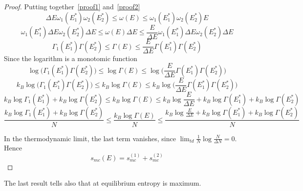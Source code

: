 \begin{proof}
        Putting together~\eqref{proof1} and~\eqref{proof2}
        \begin{equation*}
            \Delta E \omega_1(E^*_1) \omega_2(E^*_2) \leq \omega(E) \leq \omega_1(E^*_1) \omega_2(E^*_2) E
        \end{equation*}
        \begin{equation*}
            \omega_1(E^*_1) \Delta E \omega_2(E^*_2) \Delta E \leq \omega(E) \Delta E \leq \frac{E}{\Delta E} \omega_1(E^*_1) \Delta E \omega_2(E^*_2) \Delta E
        \end{equation*}
        \begin{equation*}
            \Gamma_1(E^*_1) \Gamma(E^*_2) \leq \Gamma(E) \leq \frac{E}{\Delta E}\Gamma(E^*_1) \Gamma(E^*_2)
        \end{equation*}
        Since the logarithm is a monotomic function
        \begin{equation*}
            \log \Big ( \Gamma_1(E^*_1) \Gamma(E^*_2) \Big ) \leq \log \Gamma(E) \leq \log \Big ( \frac{E}{\Delta E}\Gamma(E^*_1) \Gamma(E^*_2) \Big )
        \end{equation*}
        \begin{equation*}
            k_B \log \Big ( \Gamma_1(E^*_1) \Gamma(E^*_2) \Big ) \leq k_B \log \Gamma(E) \leq k_B \log \Big ( \frac{E}{\Delta E}\Gamma(E^*_1) \Gamma(E^*_2) \Big )
        \end{equation*}
        \begin{equation*}
            k_B \log \Gamma_1(E^*_1) + k_B \log \Gamma(E^*_2) \leq k_B \log \Gamma(E) \leq k_B \log \frac{E}{\Delta E} + k_B \log \Gamma(E^*_1) + k_B \log \Gamma(E^*_2)
        \end{equation*}
        \begin{equation*}
            \frac{k_B \log \Gamma_1(E^*_1) + k_B \log \Gamma(E^*_2)}{N} \leq \frac{k_B \log \Gamma(E)}{N} \leq \frac{k_B \log \frac{E}{\Delta E} + k_B \log \Gamma(E^*_1) + k_B \log \Gamma(E^*_2)}{N}
        \end{equation*}

        In the thermodynamic limit, the last term vanishes, since $\lim_{td} \frac{1}{N} \log \frac{N}{\Delta N} = 0$. Hence 
        \begin{equation*}
            s_{mc}(E) = s_{mc}^{(1)} + s_{mc}^{(2)}
        \end{equation*}
 
    \end{proof}

    The last result tells also that at equilibrium entropy is maximum.

